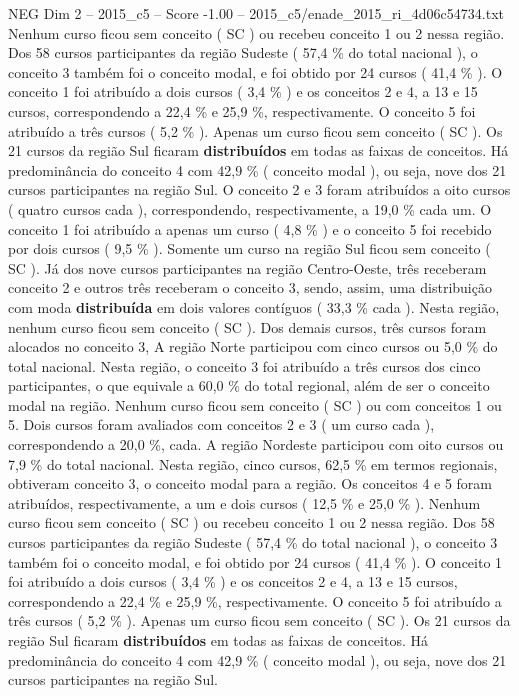 \begin{textsample}{NEG Dim 2 – 2015\_c5 – Score -1.00 – 2015\_c5/enade\_2015\_ri\_4d06c54734.txt}
Nenhum curso ficou sem conceito ( SC ) ou recebeu conceito 1 ou 2 nessa região.
Dos 58 cursos participantes da região Sudeste ( 57,4 \% do total nacional ), o conceito 3 também foi o conceito modal, e foi obtido por 24 cursos ( 41,4 \% ).
O conceito 1 foi atribuído a dois cursos ( 3,4 \% ) e os conceitos 2 e 4, a 13 e 15 cursos, correspondendo a 22,4 \% e 25,9 \%, respectivamente.
O conceito 5 foi atribuído a três cursos ( 5,2 \% ).
Apenas um curso ficou sem conceito ( SC ).
Os 21 cursos da região Sul ficaram \textbf{distribuídos} em todas as faixas de conceitos.
Há predominância do conceito 4 com 42,9 \% ( conceito modal ), ou seja, nove dos 21 cursos participantes na região Sul.
O conceito 2 e 3 foram atribuídos a oito cursos ( quatro cursos cada ), correspondendo, respectivamente, a 19,0 \% cada um.
O conceito 1 foi atribuído a apenas um curso ( 4,8 \% ) e o conceito 5 foi recebido por dois cursos ( 9,5 \% ).
Somente um curso na região Sul ficou sem conceito ( SC ).
Já dos nove cursos participantes na região Centro-Oeste, três receberam conceito 2 e outros três receberam o conceito 3, sendo, assim, uma distribuição com moda \textbf{distribuída} em dois valores contíguos ( 33,3 \% cada ).
Nesta região, nenhum curso ficou sem conceito ( SC ).
Dos demais cursos, três cursos foram alocados no conceito 3, A região Norte participou com cinco cursos ou 5,0 \% do total nacional.
Nesta região, o conceito 3 foi atribuído a três cursos dos cinco participantes, o que equivale a 60,0 \% do total regional, além de ser o conceito modal na região.
Nenhum curso ficou sem conceito ( SC ) ou com conceitos 1 ou 5.
Dois cursos foram avaliados com conceitos 2 e 3 ( um curso cada ), correspondendo a 20,0 \%, cada.
A região Nordeste participou com oito cursos ou 7,9 \% do total nacional.
Nesta região, cinco cursos, 62,5 \% em termos regionais, obtiveram conceito 3, o conceito modal para a região.
Os conceitos 4 e 5 foram atribuídos, respectivamente, a um e dois cursos ( 12,5 \% e 25,0 \% ).
Nenhum curso ficou sem conceito ( SC ) ou recebeu conceito 1 ou 2 nessa região.
Dos 58 cursos participantes da região Sudeste ( 57,4 \% do total nacional ), o conceito 3 também foi o conceito modal, e foi obtido por 24 cursos ( 41,4 \% ).
O conceito 1 foi atribuído a dois cursos ( 3,4 \% ) e os conceitos 2 e 4, a 13 e 15 cursos, correspondendo a 22,4 \% e 25,9 \%, respectivamente.
O conceito 5 foi atribuído a três cursos ( 5,2 \% ).
Apenas um curso ficou sem conceito ( SC ).
Os 21 cursos da região Sul ficaram \textbf{distribuídos} em todas as faixas de conceitos.
Há predominância do conceito 4 com 42,9 \% ( conceito modal ), ou seja, nove dos 21 cursos participantes na região Sul.

\end{textsample}
